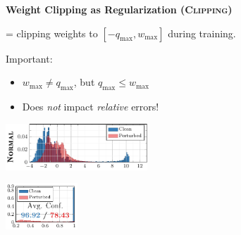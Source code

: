 \documentclass[64pt]{beamer}
\begin{document}
	\begin{frame}[t]{\bfseries Weight Clipping as Regularization (\textsc{Clipping})}
		\Large
	
		= clipping weights to $[-q_{\text{max}}, w_{\text{max}}]$ during training.
		\vspace*{0.2cm}
		
		Important:
		\begin{itemize}
			\item $w_{\text{max}} \neq q_{\text{max}}$, but $q_{\text{max}} \leq w_{\text{max}}$
			\item Does \emph{not} impact \emph{relative} errors!
		\end{itemize}
		
		\begin{tcolorbox}[
			enhanced,
			boxsep=0pt,
			left=5pt,
			right=5pt,
			top=0pt,
			toptitle=4pt,
			bottomtitle=2pt,
			bottom=0pt,
			colback=white,
			colframe=gray!12!white,
			width=1\textwidth, 
			enlarge left by=0mm,
			arc=0pt,outer arc=0pt,
			boxrule=1pt,
			title=,
			coltitle=MPIIblack,
			colbacktitle=gray!12!white,
			titlerule style=gray!12!white,
			collower=MPIIblack,
			]
			\begin{center}
				\hspace*{-0.4cm}
				\begin{minipage}[t]{0.48\textwidth}
					\vspace*{3px}
					
					\includegraphics[height=1.75cm]{../paper/c10_q81auunfp_nt_original_logits.pdf}
				\end{minipage}
				\begin{minipage}[t]{0.24\textwidth}
					\vspace*{0px}
					
					\includegraphics[height=1.75cm]{../paper/c10_q81auunfp_nt_original_confidences.pdf}
				\end{minipage}
				\begin{minipage}[t]{0.24\textwidth}
					\vspace*{0px}
					

\end{minipage}
\end{center}
\end{tcolorbox}
\end{frame}
\end{document}
